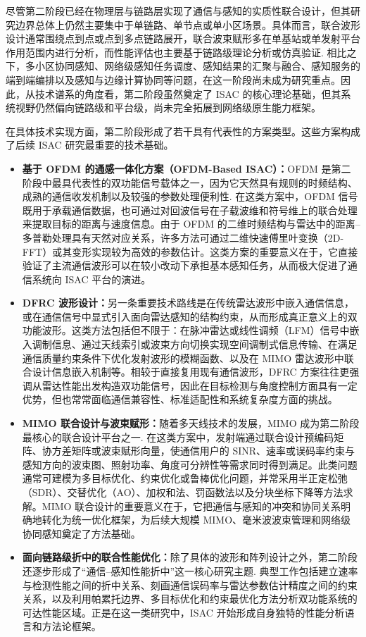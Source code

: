 尽管第二阶段已经在物理层与链路层实现了通信与感知的实质性联合设计，但其研究边界总体上仍然主要集中于单链路、单节点或单小区场景。具体而言，联合波形设计通常围绕点到点或点到多点链路展开，联合波束赋形多在单基站或单发射平台作用范围内进行分析，而性能评估也主要基于链路级理论分析或仿真验证\cite{Liu2020JointRadarComm,Liu2022ISAC}. 相比之下，多小区协同感知、网络级感知任务调度、感知结果的汇聚与融合、感知服务的端到端编排以及感知与边缘计算协同等问题，在这一阶段尚未成为研究重点。因此，从技术谱系的角度看，第二阶段虽然奠定了 ISAC 的核心理论基础，但其系统视野仍然偏向链路级和平台级，尚未完全拓展到网络级原生能力框架。

在具体技术实现方面，第二阶段形成了若干具有代表性的方案类型。这些方案构成了后续 ISAC 研究最重要的技术基础。
\begin{itemize}
    \item \textbf{基于 OFDM 的通感一体化方案（OFDM-Based ISAC）：}OFDM 是第二阶段中最具代表性的双功能信号载体之一，因为它天然具有规则的时频结构、成熟的通信收发机制以及较强的参数处理便利性\cite{Liu2022ISAC,Sturm2011WaveformDesign,Zhou2022integrated}. 在这类方案中，OFDM 信号既用于承载通信数据，也可通过对回波信号在子载波维和符号维上的联合处理来提取目标的距离与速度信息。由于 OFDM 的二维时频结构与雷达中的距离--多普勒处理具有天然对应关系，许多方法可通过二维快速傅里叶变换（2D-FFT）或其变形实现较为高效的参数估计。这类方案的重要意义在于，它直接验证了主流通信波形可以在较小改动下承担基本感知任务，从而极大促进了通信系统向 ISAC 平台的演进。
    \item \textbf{DFRC 波形设计：}另一条重要技术路线是在传统雷达波形中嵌入通信信息，或在通信信号中显式引入面向雷达感知的结构约束，从而形成真正意义上的双功能波形\cite{Hassanien2015dual,Blunt2016overview,Blunt2010Embedding}。这类方法包括但不限于：在脉冲雷达或线性调频（LFM）信号中嵌入调制信息、通过天线索引或波束方向切换实现空间调制式信息传输、在满足通信质量约束条件下优化发射波形的模糊函数、以及在 MIMO 雷达波形中联合设计信息嵌入机制等。相较于直接复用现有通信波形，DFRC 方案往往更强调从雷达性能出发构造双功能信号，因此在目标检测与角度控制方面具有一定优势，但也常常面临通信兼容性、标准适配性和系统复杂度方面的挑战。
    \item \textbf{MIMO 联合设计与波束赋形：}随着多天线技术的发展，MIMO 成为第二阶段最核心的联合设计平台之一\cite{Liu2020JointRadarComm,Li2023integrated}. 在这类方案中，发射端通过联合设计预编码矩阵、协方差矩阵或波束赋形向量，使通信用户的 SINR、速率或误码率约束与感知方向的波束图、照射功率、角度可分辨性等需求同时得到满足。此类问题通常可建模为多目标优化、约束优化或鲁棒优化问题，并常采用半正定松弛（SDR）、交替优化（AO）、加权和法、罚函数法以及分块坐标下降等方法求解。MIMO 联合设计的重要意义在于，它把通信与感知的冲突和协同关系明确地转化为统一优化框架，为后续大规模 MIMO、毫米波波束管理和网络级协同感知奠定了方法基础。
    \item \textbf{面向链路级折中的联合性能优化：}除了具体的波形和阵列设计之外，第二阶段还逐步形成了“通信--感知性能折中”这一核心研究主题\cite{Liu2020JointRadarComm,Liu2022ISAC}. 典型工作包括建立速率与检测性能之间的折中关系、刻画通信误码率与雷达参数估计精度之间的约束关系，以及利用帕累托边界、多目标优化和约束最优化方法分析双功能系统的可达性能区域。正是在这一类研究中，ISAC 开始形成自身独特的性能分析语言和方法论框架。
\end{itemize}
